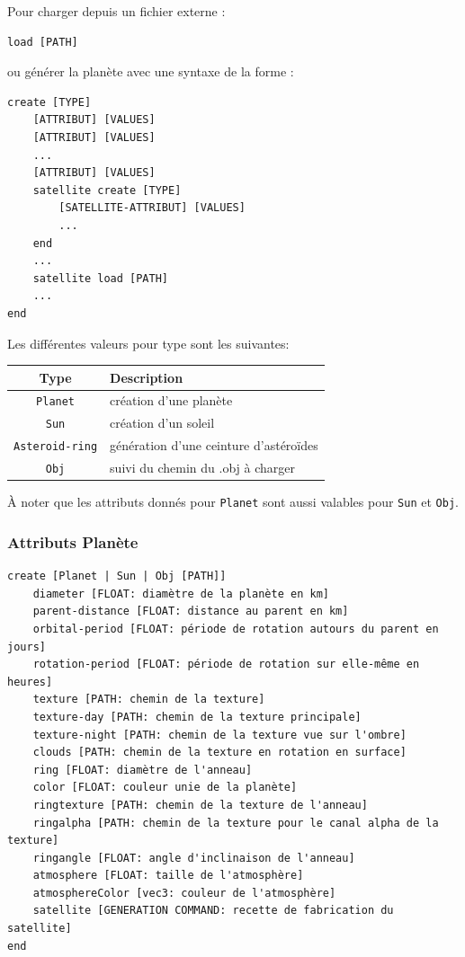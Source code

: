 \documentclass[11pt,a4paper]{article}
\begin{document}
Pour charger depuis un fichier externe :
\begin{verbatim}
load [PATH]
\end{verbatim}
ou générer la planète avec une syntaxe de la forme :
\begin{verbatim}
create [TYPE]
    [ATTRIBUT] [VALUES]
    [ATTRIBUT] [VALUES]
    ...
    [ATTRIBUT] [VALUES]
    satellite create [TYPE]
        [SATELLITE-ATTRIBUT] [VALUES]
        ...
    end
    ...
    satellite load [PATH]
    ...
end
\end{verbatim}
\newpage
Les différentes valeurs pour type sont les suivantes:
\begin{center}
\begin{tabular}{c|l}
    \hline
	\textbf{Type} & \textbf{Description} \\ \hline
   	\verb!Planet! & création d'une planète \\ \hline
   	\verb!Sun! & création d'un soleil \\ \hline
   	\verb!Asteroid-ring! & génération d'une ceinture d'astéroïdes \\ \hline
   	\verb!Obj! & suivi du chemin du .obj à charger \\ \hline
\end{tabular}
\end{center}

À noter que les attributs donnés pour \verb!Planet! sont aussi valables pour \verb!Sun! et \verb!Obj!.

\subsubsection{Attributs Planète}

\begin{verbatim}
create [Planet | Sun | Obj [PATH]]
    diameter [FLOAT: diamètre de la planète en km]
    parent-distance [FLOAT: distance au parent en km]
    orbital-period [FLOAT: période de rotation autours du parent en jours]
    rotation-period [FLOAT: période de rotation sur elle-même en heures]
    texture [PATH: chemin de la texture]
    texture-day [PATH: chemin de la texture principale]
    texture-night [PATH: chemin de la texture vue sur l'ombre]
    clouds [PATH: chemin de la texture en rotation en surface]
    ring [FLOAT: diamètre de l'anneau]
    color [FLOAT: couleur unie de la planète]
    ringtexture [PATH: chemin de la texture de l'anneau]
    ringalpha [PATH: chemin de la texture pour le canal alpha de la texture]
    ringangle [FLOAT: angle d'inclinaison de l'anneau]
    atmosphere [FLOAT: taille de l'atmosphère]
    atmosphereColor [vec3: couleur de l'atmosphère]
    satellite [GENERATION COMMAND: recette de fabrication du satellite]
end
\end{verbatim}
\end{document}
